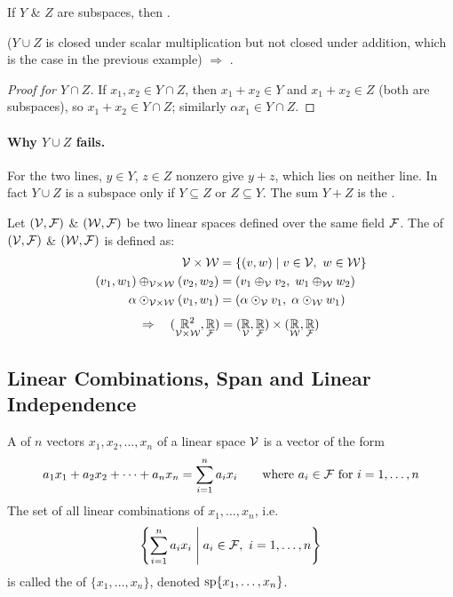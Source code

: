 \begin{remark}
If $Y$ \& $Z$ are subspaces, then .

($Y\cup Z$ is closed under scalar multiplication but not closed under addition, which is the case in the previous example) $\Rightarrow$ .
\end{remark}
\begin{insight}
\begin{proof}[Proof for $Y\cap Z$]
If $x_1,x_2\in Y\cap Z$, then $x_1+x_2\in Y$ and $x_1+x_2\in Z$ (both are subspaces), so $x_1+x_2\in Y\cap Z$; similarly $\alpha x_1\in Y\cap Z$.
\end{proof}
\paragraph{Why $Y\cup Z$ fails.} For the two lines, $y\in Y$, $z\in Z$ nonzero give $y+z$, which lies on neither line. In fact $Y\cup Z$ is a subspace only if $Y\subseteq Z$ or $Z\subseteq Y$. The sum $Y+Z$ is the .
\end{insight}

\begin{definition}
Let $(\mathcal{V},\mathcal{F})$ \& $(\mathcal{W},\mathcal{F})$ be two linear spaces defined over the same field $\mathcal{F}$. The  of $(\mathcal{V},\mathcal{F})$ \& $(\mathcal{W},\mathcal{F})$ is defined as:
\begin{align*}
\mathcal{V}\times\mathcal{W} &= \{(v,w) \mid v\in\mathcal{V},\ w\in\mathcal{W}\}\\
(v_1,w_1)\oplus_{\mathcal{V}\times\mathcal{W}}(v_2,w_2) &= (v_1\oplus_{\mathcal{V}} v_2,\; w_1\oplus_{\mathcal{W}} w_2)\\
\alpha\odot_{\mathcal{V}\times\mathcal{W}}(v_1,w_1) &= (\alpha\odot_{\mathcal{V}} v_1,\; \alpha\odot_{\mathcal{W}} w_1)
\end{align*}
\[
\Rightarrow\quad
(\underset{\mathcal{V}\times\mathcal{W}}{\mathbb{R}^2},\underset{\mathcal{F}}{\mathbb{R}}) = (\underset{\mathcal{V}}{\mathbb{R}},\underset{\mathcal{F}}{\mathbb{R}})\times(\underset{\mathcal{W}}{\mathbb{R}},\underset{\mathcal{F}}{\mathbb{R}})
\]
\end{definition}

\subsection{Linear Combinations, Span and Linear Independence}\label{ss:span-li}
\begin{definition}
A  of $n$ vectors $x_1,x_2,\dots,x_n$ of a linear space $\mathcal{V}$ is a vector of the form
\[ a_1x_1+a_2x_2+\dots+a_nx_n = \sum_{i=1}^{n} a_ix_i \qquad \text{where } a_i\in\mathcal{F} \text{ for } i=1,\dots,n \]
The set of all linear combinations of $x_1,\dots,x_n$, i.e.
\[ \left\{ \sum_{i=1}^{n} a_ix_i \;\middle|\; a_i\in\mathcal{F},\ i=1,\dots,n \right\} \]
is called the  of $\{x_1,\dots,x_n\}$, denoted $\operatorname{sp}\{x_1,\dots,x_n\}$.
\end{definition}


